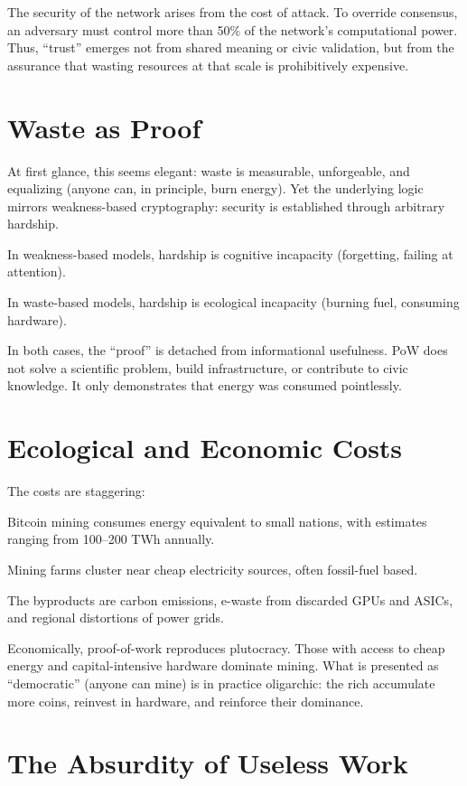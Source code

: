 \documentclass{book}
\begin{document}
The security of the network arises from the cost of attack. To override consensus, an adversary must control more than 50\% of the network’s computational power. Thus, ``trust'' emerges not from shared meaning or civic validation, but from the assurance that wasting resources at that scale is prohibitively expensive.

\section{Waste as Proof}

At first glance, this seems elegant: waste is measurable, unforgeable, and equalizing (anyone can, in principle, burn energy). Yet the underlying logic mirrors weakness-based cryptography: security is established through arbitrary hardship.

In weakness-based models, hardship is cognitive incapacity (forgetting, failing at attention).

In waste-based models, hardship is ecological incapacity (burning fuel, consuming hardware).

In both cases, the ``proof'' is detached from informational usefulness. PoW does not solve a scientific problem, build infrastructure, or contribute to civic knowledge. It only demonstrates that energy was consumed pointlessly.

\section{Ecological and Economic Costs}

The costs are staggering:

Bitcoin mining consumes energy equivalent to small nations, with estimates ranging from 100–200 TWh annually.

Mining farms cluster near cheap electricity sources, often fossil-fuel based.

The byproducts are carbon emissions, e-waste from discarded GPUs and ASICs, and regional distortions of power grids.

Economically, proof-of-work reproduces plutocracy. Those with access to cheap energy and capital-intensive hardware dominate mining. What is presented as ``democratic'' (anyone can mine) is in practice oligarchic: the rich accumulate more coins, reinvest in hardware, and reinforce their dominance.

\section{The Absurdity of Useless Work}
\end{document}
